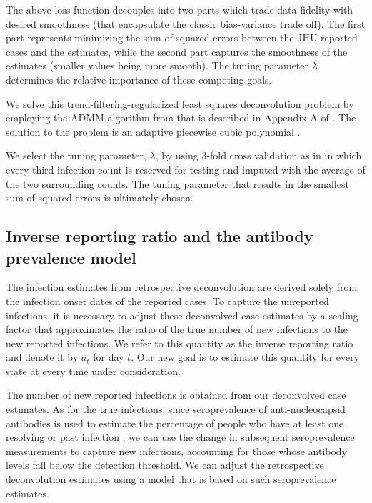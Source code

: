 \documentclass{article}
\begin{document}
The above loss function decouples into two parts which trade data fidelity with
desired smoothness (that
encapsulate the classic bias-variance trade off). The first part represents
minimizing the sum of squared errors between the JHU reported cases and the
estimates, while the second part captures the smoothness of the estimates
(smaller values being more smooth). The tuning parameter $\lambda$ determines
the relative importance of these competing goals.

We solve this trend-filtering-regularized least squares deconvolution problem by
employing the ADMM algorithm from \citet{ramdas2016fast} that is described in
Appendix A of \citet{jahja2022real}. The solution to the problem is an adaptive
piecewise cubic polynomial \citep{tibshirani2014adaptive,
tibshirani2022divided}.

We select the tuning parameter, $\lambda$, by using $3$-fold cross validation as
in \citet{jahja2022real} in which every third infection count is
reserved for testing and imputed with the average of the two surrounding counts.
The tuning parameter that results in the
smallest sum of squared errors is ultimately chosen.

\subsection{Inverse reporting ratio and the antibody prevalence model} 

The infection estimates from retrospective deconvolution are
derived solely from the infection onset dates of the reported cases. 
To capture the unreported infections, it is necessary to adjust these
deconvolved case estimates by 
a scaling factor that approximates the ratio of the true number of new infections
to the new reported infections. We refer to this quantity as the
inverse reporting ratio and denote it by $a_t$ for day $t$. Our new goal is
to estimate this quantity for every state at every time under consideration. 

The number of new reported infections is obtained from our
deconvolved case estimates. As for the true
infections, since seroprevalence of anti-nucleocapsid antibodies is used to
estimate the percentage of people who have at least one resolving or past
infection \citep{cdc2020data}, we can use
the change in subsequent seroprevalence measurements to capture new infections, 
accounting for those whose antibody levels fall below the detection threshold.
We can adjust the retrospective deconvolution estimates using a model that is 
based on such seroprevalence estimates.
 
\end{document}
